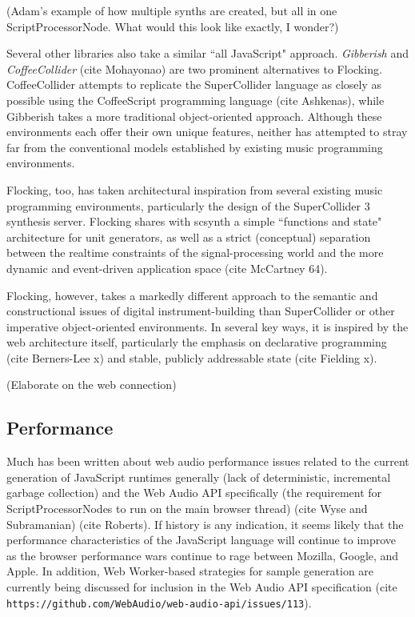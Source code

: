 \documentclass{article}
\begin{document}
(Adam's example of how multiple synths are created, but all in one ScriptProcessorNode. What would this look like exactly, I wonder?)

Several other libraries also take a similar ``all JavaScript" approach. {\it Gibberish} \cite{roberts_web_2013} and {\it CoffeeCollider} (cite Mohayonao) are two prominent alternatives to Flocking. CoffeeCollider attempts to replicate the SuperCollider language as closely as possible using the CoffeeScript programming language (cite Ashkenas), while Gibberish takes a more traditional object-oriented approach. Although these environments each offer their own unique features, neither has attempted to stray far from the conventional models established by existing music programming environments.

Flocking, too, has taken architectural inspiration from several existing music programming environments, particularly the design of the SuperCollider 3 synthesis server. Flocking shares with scsynth a simple ``functions and state" architecture for unit generators, as well as a strict (conceptual) separation between the realtime constraints of the signal-processing world and the more dynamic and event-driven application space (cite McCartney 64).

Flocking, however, takes a markedly different approach to the semantic and constructional issues of digital instrument-building than SuperCollider or other imperative object-oriented environments. In several key ways, it is inspired by the web architecture itself, particularly the emphasis on declarative programming (cite Berners-Lee x) and stable, publicly addressable state (cite Fielding x).

(Elaborate on the web connection)

\subsection{Performance}

Much has been written about web audio performance issues related to the current generation of JavaScript runtimes generally (lack of deterministic, incremental garbage collection) and the Web Audio API specifically (the requirement for ScriptProcessorNodes to run on the main browser thread) (cite Wyse and Subramanian) (cite Roberts). If history is any indication, it seems likely that the performance characteristics of the JavaScript language will continue to improve as the browser performance wars continue to rage between Mozilla, Google, and Apple. In addition, Web Worker-based strategies for sample generation are currently being discussed for inclusion in the Web Audio API specification (cite \verb|https://github.com/WebAudio/web-audio-api/issues/113|).
\end{document}
